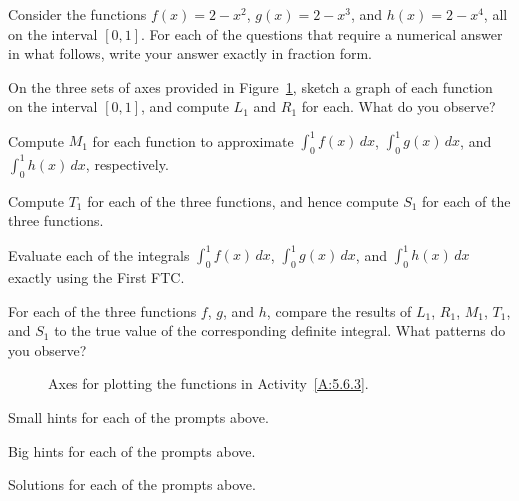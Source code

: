 \begin{activity} \label{A:5.6.3}  Consider the functions $f(x) = 2-x^2$, $g(x) = 2-x^3$, and $h(x) = 2-x^4$, all on the interval $[0,1]$.  For each of the questions that require a numerical answer in what follows, write your answer exactly in fraction form.
\ba
	\item On the three sets of axes provided in Figure~\ref{F:5.6.Act3}, sketch a graph of each function on the interval $[0,1]$, and compute $L_1$ and $R_1$ for each.  What do you observe?
	\item Compute $M_1$ for each function to approximate $\int_0^1 f(x) \,dx$, $\int_0^1 g(x) \,dx$, and $\int_0^1 h(x) \,dx$, respectively.
	\item Compute $T_1$ for each of the three functions, and hence compute $S_1$ for each of the three functions.
	\item Evaluate each of the integrals $\int_0^1 f(x) \,dx$, $\int_0^1 g(x) \,dx$, and $\int_0^1 h(x) \,dx$ exactly using the First FTC.
	\item For each of the three functions $f$, $g$, and $h$, compare the results of $L_1$, $R_1$, $M_1$, $T_1$, and $S_1$ to the true value of the corresponding definite integral.  What patterns do you observe?
\ea
\begin{figure}[h]
\begin{center}
\caption{Axes for plotting the functions in Activity~\ref{A:5.6.3}.} 
\label{F:5.6.Act3}
\end{center}
\end{figure}
\end{activity}
\begin{smallhint}
\ba
	\item Small hints for each of the prompts above.
\ea
\end{smallhint}
\begin{bighint}
\ba
	\item Big hints for each of the prompts above.
\ea
\end{bighint}
\begin{activitySolution}
\ba
	\item Solutions for each of the prompts above.
\ea
\end{activitySolution}
\aftera